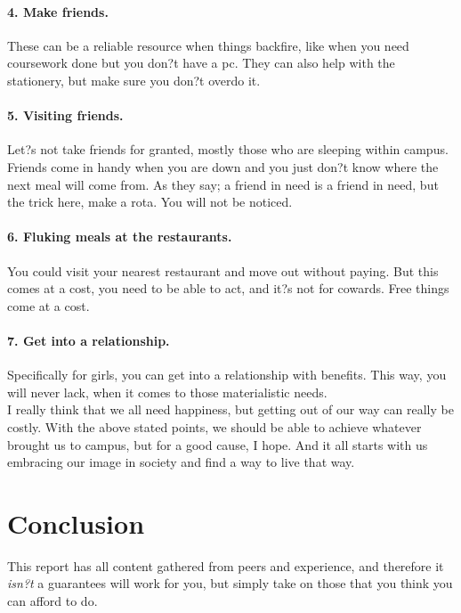 \documentclass[10pt,a4paper]{report}
\begin{document}
	\paragraph{4. Make friends.}
	These can be a reliable resource when things backfire, like when you need coursework done but you don?t have a pc. They can also help with the stationery, but make sure you don?t overdo it.
	\paragraph{5. Visiting friends.}
	Let?s not take friends for granted, mostly those who are sleeping within campus. Friends come in handy when you are down and you just don?t know where the next meal will come from. As they say; a friend in need is a friend in need, but the trick here, make a rota. You will not be noticed.
	\paragraph{6. Fluking meals at the restaurants.}
	You could visit your nearest restaurant and move out without paying. But this comes at a cost, you need to be able to act, and it?s not for cowards. Free things come at a cost.
	\paragraph{7. Get into a relationship.}
	Specifically for girls, you can get into a relationship with benefits. This way, you will never lack, when it comes to those materialistic needs.
	\\
	I really think that we all need happiness, but getting out of our way can really be costly. With the above stated points, we should be able to achieve whatever brought us to campus, but for a good cause, I hope. And it all starts with us embracing our image in society and find a way to live that way. 
	\section*{Conclusion}
	This report has all content gathered from peers and experience, and therefore it \textit{isn?t} a guarantees will work for you, but simply take on those that you think you can afford to do. 
\end{document}
